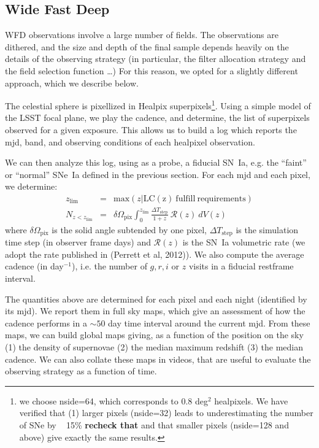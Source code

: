 \documentclass [11pt,a4paper]{article}
\newcommand{\FixMe}[1]{{\color{red} \bf \large #1}}
\begin{document}
\subsection{Wide Fast Deep}
WFD observations involve a large number of fields.  The observations
are dithered, and the size and depth of the final sample depends
heavily on the details of the observing strategy (in particular, the
filter allocation strategy and the field selection function \ldots)
For this reason, we opted for a slightly different approach, which we
describe below.

The celestial sphere is pixellized in Healpix superpixels\footnote{we
  choose nside=64, which corresponds to 0.8 deg$^2$ healpixels.  We
  have verified that (1) larger pixels (nside=32) leads to
  underestimating the number of SNe by ~ 15\% \FixMe{recheck that} and
  that smaller pixels (nside=128 and above) give exactly the same
  results.}.  Using a simple model of the LSST focal plane, we play
the cadence, and determine, the list of superpixels observed for a
given exposure. This allows us to build a log which reports the mjd,
band, and observing conditions of each healpixel observation.

We can then analyze this log, using as a probe, a fiducial SN~Ia,
e.g. the ``faint'' or ``normal'' SNe~Ia defined in the previous
section. For each mjd and each pixel, we determine:
\begin{eqnarray}
  z_{\mathrm{lim}} & = & \mathrm{max}\left(z | \mathrm{LC(z)\ fulfill\ requirements}\right) \\
  N_{z<z_{\mathrm{lim}}} &= & \delta\Omega_{\mathrm{pix}} \int_0^{z_\mathrm{lim}} \frac{\Delta T_{\mathrm{step}}}{1+z}\ {\mathcal{R}}(z)\ dV(z)
\end{eqnarray}
where $\delta\Omega_{\mathrm{pix}}$ is the solid angle subtended by
one pixel, $\Delta T_{\mathrm{step}}$ is the simulation time step (in
observer frame days) and $\mathcal{R}(z)$ is the SN~Ia volumetric rate
(we adopt the rate published in (Perrett et al, 2012)).  We also
compute the average cadence (in day$^{-1}$), i.e. the number of $g, r,
i$ or $z$ visits in a fiducial restframe interval.

The quantities above are determined for each pixel and each night
(identified by its mjd).  We report them in full sky maps, which give
an assessment of how the cadence performs in a $\sim 50$ day time
interval around the current mjd. From these maps, we can build global
maps giving, as a function of the position on the sky (1) the density
of supernovae (2) the median maximum redshift (3) the median cadence.
We can also collate these maps in videos, that are useful to evaluate
the observing strategy as a function of time.
\end{document}
